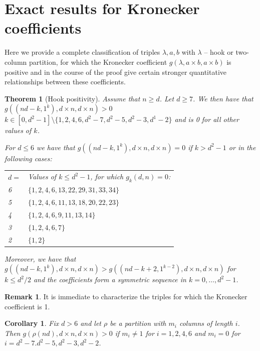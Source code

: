 \documentclass{article}
\numberwithin{equation}{section}
\newtheorem{theorem}[equation]{Theorem}
\newtheorem{corollary}[equation]{Corollary}
\theoremstyle{definition}
\newtheorem{remark}[equation]{Remark}
\begin{document}
\section{Exact results for Kronecker coefficients}\label{sec:morepositivity}

Here we provide a complete classification of triples $\lambda, a, b$ with $\lambda$ -- hook or two-column partition, for which the Kronecker coefficient $g(\lambda, a \times b, a \times b)$ is positive and in the course of the proof give certain stronger quantitative relationships between these coefficients. 

\begin{theorem}[Hook positivity]\label{thm:hook_positive}
Assume that $n \geq d$. 
Let $d \geq 7 $. We then have that $g((nd-k,1^k), d \times n, d\times n) >0$  $k \in [0,d^2-1] \setminus \{1,2,4,6, d^2-7,d^2-5, d^2-3, d^1-2\}$ and is 0 for all other values of $k$.

For $d \leq 6$ we have that $g((nd-k,1^k), d \times n, d\times n) =0$ if $k >d^2-1$ or in the following cases:

\begin{tabular}{p{1in}p{4in}}
$d=$ & Values of $k \leq d^2-1$, for which $g_k(d,n)=0$: \\
6 & $\{1,2,4,6,13,22,29, 31, 33, 34\}$\\
5 & $\{1,2,4,6,11,13, 18, 20, 22, 23\}$\\
4 & $\{ 1,2,4,6, 9, 11, 13, 14\}$\\
3 & $\{1,2,4,6,7\}$\\
2& $\{1,2\}$ \\
\end{tabular}

Moreover, we have that $g((nd-k,1^k), d \times n, d\times n) > g((nd-k+2,1^{k-2}), d \times n, d\times n)$ for $k \leq d^2/2$ and the coefficients form a symmetric sequence in $k=0,\ldots,d^2-1$.
\end{theorem}

\begin{remark}
It is immediate to characterize the triples for which the Kronecker coefficient is 1. 
\end{remark}


\begin{corollary}
Fix $d>6$ and let $\rho$ be a partition with $m_i$ columns of length $i$. Then $g(\rho(nd), d \times n, d\times n)>0$ if $m_i \neq 1$ for $i=1,2,4,6$ and $m_i = 0 $ for $i=d^2-7. d^2-5, d^2 - 3, d^2-2$.
\end{corollary}
\end{document}
